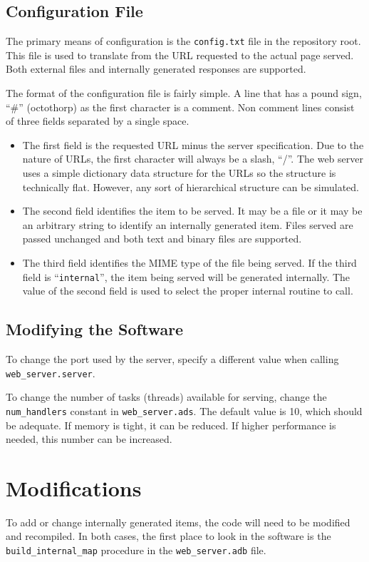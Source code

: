 \documentclass[10pt, openany, draft]{article}
\begin{document}
\subsection{Configuration File}
The primary means of configuration is the \texttt{config.txt} file in the repository root.  This file is used to translate from the URL requested to the actual page served.  Both external files and internally generated responses are supported.

The format of the configuration file is fairly simple.  A line that has a pound sign, ``\#'' (octothorp) as the first character is a comment.  Non comment lines consist of three fields separated by a single space.
\begin{itemize}
  \item The first field is the requested URL minus the server specification.  Due to the nature of URLs, the first character will always be a slash, ``/''.  The web server uses a simple dictionary data structure for the URLs so the structure is technically flat.  However, any sort of hierarchical structure can be simulated.
  \item The second field identifies the item to be served.  It may be a file or it may be an arbitrary string to identify an internally generated item.  Files served are passed unchanged and both text and binary files are supported.
  \item The third field identifies the MIME type of the file being served.  If the third field is ``\texttt{internal}'', the item being served will be generated internally.  The value of the second field is used to select the proper internal routine to call.
\end{itemize}

\subsection{Modifying the Software}
To change the port used by the server, specify a different value when calling \texttt{web\_server.server}.

To change the number of tasks (threads) available for serving, change the \texttt{num\_handlers} constant in \texttt{web\_server.ads}.  The default value is 10, which should be adequate.  If memory is tight, it can be reduced. If higher performance is needed, this number can be increased.

\section{Modifications}
To add or change internally generated items, the code will need to be modified and recompiled.  In both cases, the first place to look in the software is the \texttt{build\_internal\_map} procedure in the \texttt{web\_server.adb} file.
\end{document}
